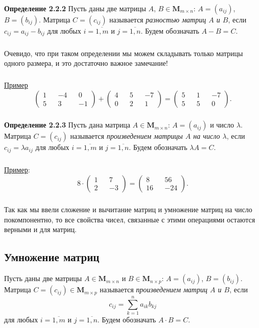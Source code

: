 \documentclass[12pt,a4paper]{article}
\begin{document}
\textbf{Определение 2.2.2} 
Пусть даны две матрицы $A$, $B \in \textbf{M}_{m \times n}$: $A = (a_{ij})$, $B = (b_{ij})$. Матрица $C = (c_{ij})$ называется \textit{разностью матриц $A$ и $B$}, если $c_{ij} = a_{ij} - b_{ij}$ для любых $i = \overline{1, m}$ и $j = \overline{1, n}$. Будем обозначать $A - B = C$.

\subparagraph{}
Очевидо, что при таком определении мы можем складывать только матрицы одного размера, и это достаточно важное замечание!

\subparagraph{}
\underline{Пример}
\[\begin{pmatrix}
1 && -4 && 0 \\
5 && 3 && -1 
\end{pmatrix} + \begin{pmatrix}
4 && 5 && -7 \\
0 && 2 && 1 
\end{pmatrix} = \begin{pmatrix}
5 && 1 && -7 \\
5 && 5 && 0 
\end{pmatrix}.
\]

\subparagraph{}
\textbf{Определение 2.2.3} 
Пусть дана матрица $A \in \textbf{M}_{m \times n}$: $A = (a_{ij})$ и число $\lambda$. Матрица $C = (c_{ij})$ называется \textit{произведением матрицы $A$ на число $\lambda$}, если $c_{ij} = \lambda a_{ij}$ для любых $i = \overline{1, m}$ и $j = \overline{1, n}$. Будем обозначать 
$\lambda A= C$.

\subparagraph{}
\underline{Пример}:
\[8 \cdot \begin{pmatrix}
1 && 7 \\
2 && -3 
\end{pmatrix} = \begin{pmatrix}
8 && 56  \\
16 && -24  
\end{pmatrix}.
\]

\subparagraph{}
Так как мы ввели сложение и вычитание матриц и умножение матриц на число покомпонентно, то все свойства чисел, связанные с этими операциями остаются верными и для матриц.

\subsection{Умножение матриц}
Пусть даны две матрицы $A \in \textbf{M}_{m \times n}$ и $B \in \textbf{M}_{n \times p}$: $A = (a_{ij})$, $B = (b_{ij})$. Матрица $C = (c_{ij}) \in \textbf{M}_{m \times p}$ называется \textit{произведением матриц $A$ и $B$}, если \[c_{ij} = \sum_{k=1}^n a_{ik}b_{kj}\] для любых $i = \overline{1, m}$ и $j = \overline{1, n}$. Будем обозначать $A \cdot B = C$.
\end{document}
